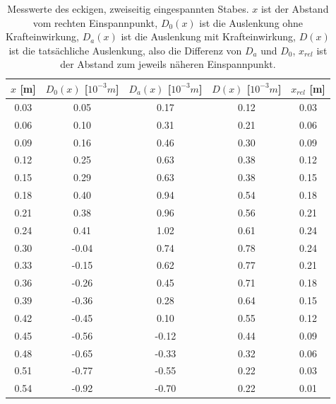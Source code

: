 \documentclass[titlepage = firstcover]{scrartcl}
\begin{document}
        \begin{table}[h]
          \centering
          \caption{Messwerte des eckigen, zweiseitig eingespannten Stabes.
                   $x$ ist der Abstand vom rechten Einspannpunkt,
                   $D_0(x)$ ist die Auslenkung ohne Krafteinwirkung,
                   $D_a(x)$ ist die Auslenkung mit Krafteinwirkung,
                   $D(x)$ ist die tatsächliche Auslenkung, also die Differenz von $D_a$ und $D_0$,
                   $x_{rel}$ ist der Abstand zum jeweils näheren Einspannpunkt.}
          \label{tab:tabEzwei}
          \begin{tabular}{c c c c c}
            \toprule
            {$x$ [m]} & {$D_0(x)$ [$10^{-3}m$]} & {$D_a(x)$ [$10^{-3}m$]} & {$D(x)$ [$10^{-3}m$]} & {$x_{rel}$ [m]}\\
            \midrule
            0.03 &  0.05 &  0.17 & 0.12 & 0.03\\
            0.06 &  0.10 &  0.31 & 0.21 & 0.06\\
            0.09 &  0.16 &  0.46 & 0.30 & 0.09\\
            0.12 &  0.25 &  0.63 & 0.38 & 0.12\\
            0.15 &  0.29 &  0.63 & 0.38 & 0.15\\
            0.18 &  0.40 &  0.94 & 0.54 & 0.18\\
            0.21 &  0.38 &  0.96 & 0.56 & 0.21\\
            0.24 &  0.41 &  1.02 & 0.61 & 0.24\\
            0.30 & -0.04 &  0.74 & 0.78 & 0.24\\
            0.33 & -0.15 &  0.62 & 0.77 & 0.21\\
            0.36 & -0.26 &  0.45 & 0.71 & 0.18\\
            0.39 & -0.36 &  0.28 & 0.64 & 0.15\\
            0.42 & -0.45 &  0.10 & 0.55 & 0.12\\
            0.45 & -0.56 & -0.12 & 0.44 & 0.09\\
            0.48 & -0.65 & -0.33 & 0.32 & 0.06\\
            0.51 & -0.77 & -0.55 & 0.22 & 0.03\\
            0.54 & -0.92 & -0.70 & 0.22 & 0.01\\
            \bottomrule            
          \end{tabular}
        \end{table}
  
        \newpage
\end{document}
